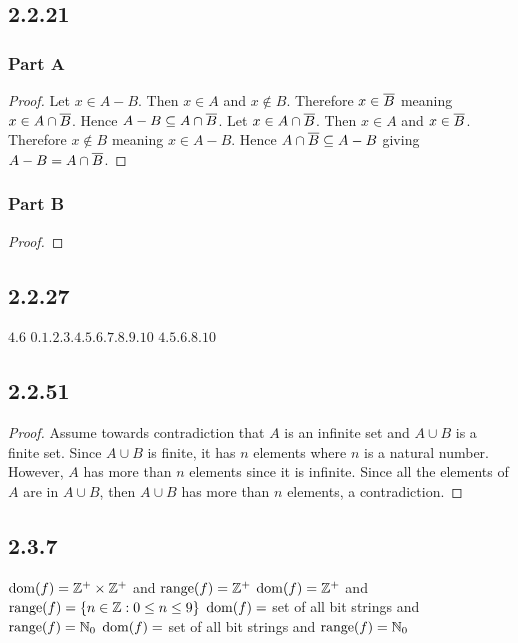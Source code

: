 \documentclass[12pt,titlepage]{extarticle}
\begin{document}
\subsection*{2.2.21}
\subsubsection*{Part A}
\begin{proof}
    Let $x \in A - B$. Then $x \in A$ and $x \notin B$. Therefore $x \in \overline{B}$ meaning $x \in A \cap \overline{B}$. Hence $A - B \subseteq A \cap \overline{B}$. Let $x \in A \cap \overline{B}$. Then $x \in A$ and $x \in \overline{B}$. Therefore $x \notin B$ meaning $x \in A - B$. Hence $A \cap \overline{B} \subseteq A - B$ giving $A - B = A \cap \overline{B}$.
\end{proof}

\subsubsection*{Part B} %
\begin{proof}
    
\end{proof}

\subsection*{2.2.27}
\begin{tasks}
    \task $\qty{4,6}$
    \task $\qty{0,1,2,3,4,5,6,7,8,9,10}$
    \task $\qty{4,5,6,8,10}$
\end{tasks}

\subsection*{2.2.51}
\begin{proof}
    Assume towards contradiction that $A$ is an infinite set and $A \cup B$ is a finite set. Since $A \cup B$ is finite, it has $n$ elements where $n$ is a natural number. However, $A$ has more than $n$ elements since it is infinite. Since all the elements of $A$ are in $A \cup B$, then $A \cup B$ has more than $n$ elements, a contradiction.
\end{proof}

\subsection*{2.3.7}
\begin{tasks}
    \task $\operatorname{dom}(f) = \mathbb{Z}^+ \times \mathbb{Z}^+$ and $\operatorname{range}(f) = \mathbb{Z}^+$
    \task $\operatorname{dom}(f) = \mathbb{Z}^+$ and $\operatorname{range}(f) = \qty{n \in \mathbb{Z}: 0 \leq n \leq 9}$
    \task $\operatorname{dom}(f) = $ set of all bit strings and $\operatorname{range}(f) = \mathbb{N}_0$
    \task $\operatorname{dom}(f) = $ set of all bit strings and $\operatorname{range}(f) = \mathbb{N}_0$
\end{tasks}
\end{document}
